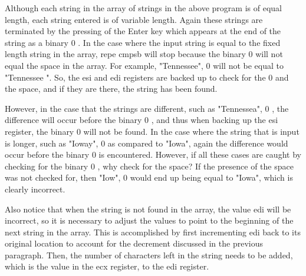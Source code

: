 \documentclass[10pt]{article}
\begin{document}
Although each string in the array of strings in the above program is of equal length, each string entered is of variable length. Again these strings are terminated by the pressing of the Enter key which appears at the end of the string as a binary 0 . In the case where the input string is equal to the fixed length string in the array, repe cmpsb will stop because the binary 0 will not equal the space in the array. For example, "Tennessee", 0 will not be equal to "Tennessee ". So, the esi and edi registers are backed up to check for the 0 and the space, and if they are there, the string has been found.

However, in the case that the strings are different, such as "Tennessea", 0 , the difference will occur before the binary 0 , and thus when backing up the esi register, the binary 0 will not be found. In the case where the string that is input is longer, such as "Ioway", 0 as compared to "Iowa", again the difference would occur before the binary 0 is encountered. However, if all these cases are caught by checking for the binary 0 , why check for the space? If the presence of the space was not checked for, then "Iow", 0 would end up being equal to "Iowa", which is clearly incorrect.

Also notice that when the string is not found in the array, the value edi will be incorrect, so it is necessary to adjust the values to point to the beginning of the next string in the array. This is accomplished by first incrementing edi back to its original location to account for the decrement discussed in the previous paragraph. Then, the number of characters left in the string needs to be added, which is the value in the ecx register, to the edi register.
\end{document}
